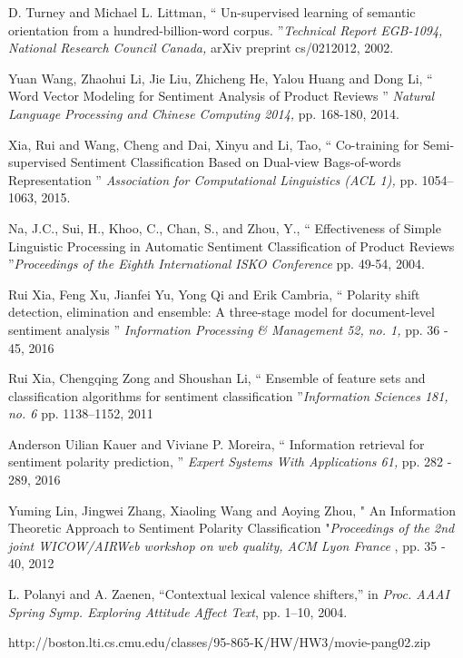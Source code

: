 \documentclass[oneside,a4paper,12pt]{pictreport}
\begin{document}
\begin{thebibliography}{20}
 
  
  D. Turney and Michael L. Littman, `` Un-supervised learning of semantic orientation from
a hundred-billion-word corpus. ''{\em Technical Report
EGB-1094, National Research Council Canada,} arXiv preprint cs/0212012, 2002.

  Yuan Wang, Zhaohui Li, Jie Liu, Zhicheng He, Yalou Huang and Dong Li,
 `` Word Vector Modeling for Sentiment Analysis
of Product Reviews '' {\em Natural Language Processing and Chinese Computing 2014,} pp. 168-180, 2014.


Xia, Rui and Wang, Cheng and Dai, Xinyu and Li, Tao, 
`` Co-training for Semi-supervised Sentiment Classification Based on Dual-view Bags-of-words Representation ''
  {\em Association for Computational Linguistics (ACL 1),} pp. 1054–1063, 2015.
  
Na, J.C., Sui, H., Khoo, C., Chan, S., and Zhou, Y., `` Effectiveness of Simple Linguistic Processing in Automatic 
Sentiment Classification of Product Reviews ''{\em Proceedings 
of the Eighth International ISKO Conference
 } pp. 49-54, 2004.
 
 Rui Xia, Feng Xu, Jianfei Yu, Yong Qi and Erik Cambria, `` Polarity shift detection, elimination and ensemble:
A three-stage model for document-level sentiment analysis '' {\em  Information Processing \& Management 52, no. 1, } pp. 36 - 45, 2016

Rui Xia, Chengqing Zong and Shoushan Li, `` Ensemble of feature sets and classification algorithms
for sentiment classification ''{\em  Information Sciences 181, no. 6 } pp. 1138–1152, 2011

Anderson Uilian Kauer and Viviane P. Moreira, `` Information retrieval for sentiment polarity prediction, ''
{\em Expert Systems With Applications 61,} pp. 282 - 289, 2016

Yuming Lin, Jingwei Zhang, Xiaoling Wang and Aoying Zhou, " An Information Theoretic Approach to Sentiment Polarity
Classification "{\em Proceedings of the 2nd joint WICOW/AIRWeb workshop on web quality, ACM Lyon France }, pp. 35 - 40, 2012


L. Polanyi and A. Zaenen, “Contextual lexical valence shifters,” in
{\em Proc. AAAI Spring Symp. Exploring Attitude Affect Text}, pp. 1–10, 2004.

http://boston.lti.cs.cmu.edu/classes/95-865-K/HW/HW3/movie-pang02.zip
\end{thebibliography}
\end{document}
